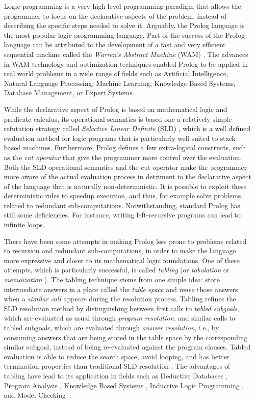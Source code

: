 Logic programming is a very high level programming paradigm that allows the programmer
to focus on the declarative aspects of the problem, instead of describing the specific steps
needed to solve it. Arguably, the Prolog language is the most popular logic
programming language. Part of the success of the Prolog language can be attributed to the
development of a fast and very efficient sequential machine called the \emph{Warren's Abstract Machine}
(WAM) \cite{Warren-83}. The advances in WAM technology and optimization techniques enabled Prolog
to be applied in real world problems in a wide range of fields such as Artificial Intelligence,
Natural Language Processing, Machine Learning, Knowledge Based Systems, Database Management, or
Expert Systems.

While the declarative aspect of Prolog is based on mathematical logic and predicate calculus,
its operational semantics is based one a relatively simple refutation strategy called \emph{Selective Linear Definite}
(SLD) \cite{Lloyd-87}, which is a well defined evaluation method for logic programs that
is particularly well suited to stack based machines.
Furthermore, Prolog defines a few extra-logical constructs, such as the \emph{cut operator}
that give the programmer more control over the evaluation. Both the SLD operational semantics
and the cut operator make the programmer more aware of the actual evaluation process in detriment to the
declarative aspect of the language that is naturally non-deterministic. It is possible to exploit
these deterministic rules to speedup execution, and thus, for example
solve problems related to redundant sub-computations. Notwithstanding, standard Prolog has
still some deficiencies. For instance, writing left-recursive programs can lead to infinite loops.

There have been some attempts in making Prolog less prone to problems related to recursion
and redundant sub-computations, in order to make the language more expressive and closer to
its mathematical logic foundations.
One of these attempts, which is particularly successful, is called \emph{tabling}
(or \emph{tabulation} or \emph{memoization} \cite{Michie-68}). The tabling technique stems from one simple idea:
store intermediate answers in a place called the \emph{table space} and reuse those answers when a
\emph{similar call} appears during the resolution process. Tabling refines the SLD resolution method
by distinguishing between first calls to \emph{tabled subgoals}, which are evaluated as usual through
\emph{program resolution}, and similar calls to tabled subgoals, which are evaluated through \emph{answer resolution}, i.e.,
by consuming answers that are being stored in the table space by the corresponding similar subgoal, instead
of being re-evaluated against the program clauses. Tabled evaluation is able to reduce the search space,
avoid looping, and has better termination properties than traditional SLD resolution \cite{Chen-96}.
The advantages of tabling have lead to its application in fields such as Deductive Databases \cite{Sagonas-94},
Program Analysis \cite{RamakrishnanCR-00}, Knowledge Based Systems \cite{Yang-00}, Inductive Logic
Programming \cite{Rocha-05b}, and Model Checking~\cite{RamakrishnanCR-00}.

